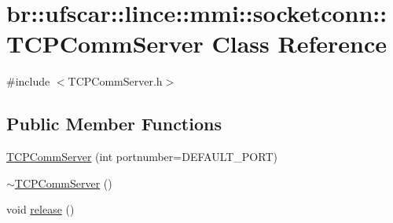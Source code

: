 \hypertarget{classbr_1_1ufscar_1_1lince_1_1mmi_1_1socketconn_1_1TCPCommServer}{
\section{br::ufscar::lince::mmi::socketconn::TCPCommServer Class Reference}
\label{classbr_1_1ufscar_1_1lince_1_1mmi_1_1socketconn_1_1TCPCommServer}
}


{\ttfamily \#include $<$TCPCommServer.h$>$}

\subsection*{Public Member Functions}
\begin{DoxyCompactItemize}
\item 
\hyperlink{classbr_1_1ufscar_1_1lince_1_1mmi_1_1socketconn_1_1TCPCommServer_a3f53b0b1078c2b1c3bf6975eddcc2bd2}{TCPCommServer} (int portnumber=DEFAULT\_\-PORT)
\item 
\hyperlink{classbr_1_1ufscar_1_1lince_1_1mmi_1_1socketconn_1_1TCPCommServer_a528689c5a4c14f578cfdc659a03f4c99}{$\sim$TCPCommServer} ()
\item 
void \hyperlink{classbr_1_1ufscar_1_1lince_1_1mmi_1_1socketconn_1_1TCPCommServer_ad34949969d9e206c46e71d5f9c86c44d}{release} ()
\end{DoxyCompactItemize}


